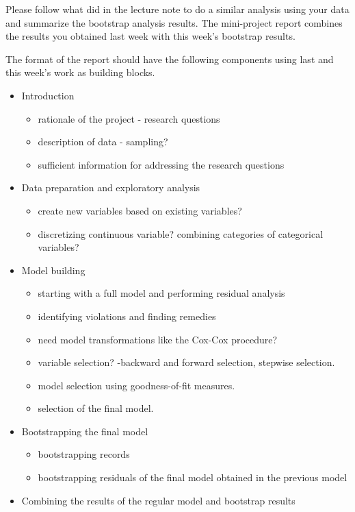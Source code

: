 \documentclass[
]{book}
\providecommand{\tightlist}{%
  \setlength{\itemsep}{0pt}\setlength{\parskip}{0pt}}
\begin{document}
Please follow what did in the lecture note to do a similar analysis using your data and summarize the bootstrap analysis results. The mini-project report combines the results you obtained last week with this week's bootstrap results.

The format of the report should have the following components using last and this week's work as building blocks.

\begin{itemize}
\tightlist
\item
  Introduction

  \begin{itemize}
  \tightlist
  \item
    rationale of the project - research questions
  \item
    description of data - sampling?
  \item
    sufficient information for addressing the research questions
  \end{itemize}
\item
  Data preparation and exploratory analysis

  \begin{itemize}
  \tightlist
  \item
    create new variables based on existing variables?
  \item
    discretizing continuous variable? combining categories of categorical variables?
  \end{itemize}
\item
  Model building

  \begin{itemize}
  \tightlist
  \item
    starting with a full model and performing residual analysis
  \item
    identifying violations and finding remedies
  \item
    need model transformations like the Cox-Cox procedure?
  \item
    variable selection? -backward and forward selection, stepwise selection.
  \item
    model selection using goodness-of-fit measures.
  \item
    selection of the final model.
  \end{itemize}
\item
  Bootstrapping the final model

  \begin{itemize}
  \tightlist
  \item
    bootstrapping records
  \item
    bootstrapping residuals of the final model obtained in the previous model
  \end{itemize}
\item
  Combining the results of the regular model and bootstrap results


\end{itemize}
\end{document}
